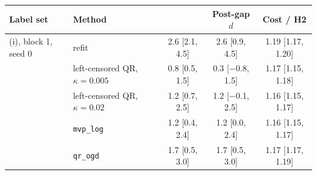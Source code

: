 \begin{tabular}{@{}llccc@{}}
\toprule
Label set & Method & \Dbar{} & Post-gap $d$ & Cost / H2 \\
\midrule
(i), block 1, seed 0 & refit & 2.6 [2.1, 4.5] & 2.6 [0.9, 4.5] & 1.19 [1.17, 1.20] \\
 & left-censored QR, $\kappa=0.005$ & 0.8 [0.5, 1.5] & 0.3 [$-$0.8, 1.5] & 1.17 [1.15, 1.18] \\
 & left-censored QR, $\kappa=0.02$ & 1.2 [0.7, 2.5] & 1.2 [$-$0.1, 2.5] & 1.16 [1.15, 1.17] \\
 & \texttt{mvp\_log} & 1.2 [0.4, 2.4] & 1.2 [0.0, 2.4] & 1.16 [1.15, 1.17] \\
 & \texttt{qr\_ogd} & 1.7 [0.5, 3.0] & 1.7 [0.5, 3.0] & 1.17 [1.17, 1.19] \\
\bottomrule
\end{tabular}
